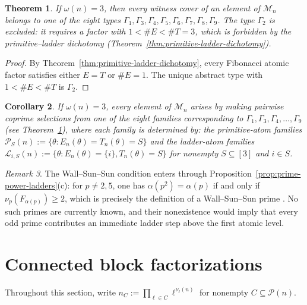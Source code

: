 \documentclass[11pt,letterpaper]{article}
\numberwithin{equation}{section}
\theoremstyle{plain}
\newtheorem{theorem}{Theorem}[section]
\newtheorem{corollary}[theorem]{Corollary}
\theoremstyle{definition}
\theoremstyle{remark}
\newtheorem{remark}[theorem]{Remark}
\begin{document}
\begin{theorem}\label{thm:fibonacci-three-coordinate-types}
If $\omega(n)=3$, then every witness cover of an element of $\mathcal M_n$
belongs to one of the eight types
$\Gamma_1,\Gamma_3,\Gamma_4,\Gamma_5,\Gamma_6,\Gamma_7,\Gamma_8,\Gamma_9$.
The type $\Gamma_2$ is excluded: it requires a factor with
$1<\#E<\#T=3$, which is forbidden by the primitive--ladder dichotomy
\textup{(Theorem~\ref{thm:primitive-ladder-dichotomy})}.
\end{theorem}

\begin{proof}
By Theorem~\ref{thm:primitive-ladder-dichotomy}, every Fibonacci atomic
factor satisfies either $E=T$ or $\#E=1$. The unique abstract type with
$1<\#E<\#T$ is $\Gamma_2$.
\end{proof}

\begin{corollary}\label{cor:three-coordinate-realization}
If $\omega(n)=3$, every element of $\mathcal M_n$ arises by making pairwise
coprime selections from one of the eight families corresponding to
$\Gamma_1,\Gamma_3,\Gamma_4,\dots,\Gamma_9$ (see
Theorem~\ref{thm:fibonacci-three-coordinate-types}), where each family is
determined by: the primitive-atom families
$\mathcal P_S(n):=\{\theta:E_n(\theta)=T_n(\theta)=S\}$ and the ladder-atom
families
$\mathcal L_{i,S}(n):=\{\theta:E_n(\theta)=\{i\},T_n(\theta)=S\}$ for
nonempty $S\subseteq[3]$ and $i\in S$.
\end{corollary}

\begin{remark}\label{rem:wss}
The Wall--Sun--Sun condition enters through
Proposition~\ref{prop:prime-power-ladders}(c): for $p\neq 2,5$, one has
$\alpha(p^2)=\alpha(p)$ if and only if $\nu_p(F_{\alpha(p)})\ge 2$, which is
precisely the definition of a Wall--Sun--Sun prime
\cite{SunSun1992FibonacciFLT}. No such primes are currently known, and their
nonexistence would imply that every odd prime contributes an immediate ladder
step above the first atomic level.
\end{remark}

\section{Connected block factorizations}\label{sec:connected}

Throughout this section, write
$n_C:=\prod_{\ell\in C}\ell^{\nu_\ell(n)}$ for nonempty
$C\subseteq\mathcal P(n)$.
\end{document}
